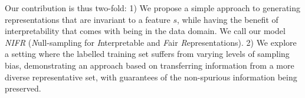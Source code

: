 

Our contribution is thus two-fold:
1) We propose a simple approach to generating representations 
that are invariant to a feature $s$, while having the benefit of interpretability that comes with being in the data domain.
We call our model \emph{NIFR} (\emph{N}ull-sampling for \emph{I}nterpretable and \emph{F}air \emph{R}epresentations).
2) We explore a setting where the labelled training set suffers from varying levels of sampling bias,
demonstrating an approach based on transferring information from a more diverse representative set,
with guarantees of the non-spurious information being preserved.

